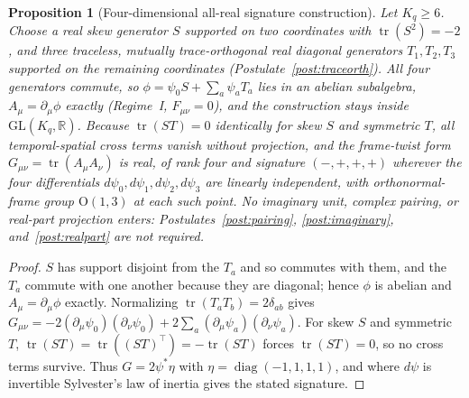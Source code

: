 \documentclass[11pt]{article}
\newtheorem{proposition}{Proposition}
\begin{document}
\begin{proposition}[Four-dimensional all-real signature construction]\label{prop:4d_signature}
Let $K_q \geq 6$. Choose a real skew generator $S$ supported on two coordinates with $\operatorname{tr}(S^2) = -2$, and three traceless, mutually trace-orthogonal real diagonal generators $T_1, T_2, T_3$ supported on the remaining coordinates (Postulate~\ref{post:traceorth}). All four generators commute, so $\phi = \psi_0 S + \sum_a \psi_a T_a$ lies in an abelian subalgebra, $A_\mu = \partial_\mu\phi$ exactly (Regime~I, $F_{\mu\nu} = 0$), and the construction stays inside $\mathrm{GL}(K_q,\mathbb{R})$. Because $\operatorname{tr}(ST) = 0$ identically for skew $S$ and symmetric $T$, all temporal-spatial cross terms vanish without projection, and the frame-twist form $G_{\mu\nu} = \operatorname{tr}(A_\mu A_\nu)$ is real, of rank four and signature $(-,+,+,+)$ wherever the four differentials $d\psi_0, d\psi_1, d\psi_2, d\psi_3$ are linearly independent, with orthonormal-frame group $\mathrm{O}(1,3)$ at each such point. No imaginary unit, complex pairing, or real-part projection enters: Postulates~\ref{post:pairing}, \ref{post:imaginary}, and~\ref{post:realpart} are not required.
\end{proposition}
\begin{proof}
$S$ has support disjoint from the $T_a$ and so commutes with them, and the $T_a$ commute with one another because they are diagonal; hence $\phi$ is abelian and $A_\mu = \partial_\mu\phi$ exactly. Normalizing $\operatorname{tr}(T_a T_b) = 2\delta_{ab}$ gives $G_{\mu\nu} = -2(\partial_\mu\psi_0)(\partial_\nu\psi_0) + 2\sum_a (\partial_\mu\psi_a)(\partial_\nu\psi_a)$. For skew $S$ and symmetric $T$, $\operatorname{tr}(ST) = \operatorname{tr}((ST)^\top) = -\operatorname{tr}(ST)$ forces $\operatorname{tr}(ST) = 0$, so no cross terms survive. Thus $G = 2\psi^*\eta$ with $\eta = \operatorname{diag}(-1,1,1,1)$, and where $d\psi$ is invertible Sylvester's law of inertia gives the stated signature.
\end{proof}
\end{document}
